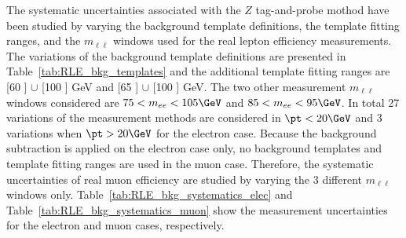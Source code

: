 The systematic uncertainties associated with the $Z$ tag-and-probe mothod have been studied by varying the background template definitions, the template fitting ranges, and the $m_{\ell\ell}$ windows used for the real lepton efficiency measurements.
The variations of the background template definitions are presented in Table~\ref{tab:RLE_bkg_templates} and the additional template fitting ranges are [60 ] $\cup$ [100 ] GeV and [65 ] $\cup$ [100 ] GeV.
The two other measurement $m_{\ell\ell}$ windows considered are $75<m_{ee}<105 \GeV$ and $85<m_{ee}<95 \GeV$.
In total 27 variations of the measurement methods are considered in $\pt<20 \GeV$ and 3 variations when $\pt>20 \GeV$ for the electron case.
Because the background subtraction is applied on the electron case only, no background templates and template fitting ranges are used in the muon case.
Therefore, the systematic uncertainties of real muon efficiency are studied by varying the 3 different $m_{\ell\ell}$ windows only.
Table~\ref{tab:RLE_bkg_systematics_elec} and Table~\ref{tab:RLE_bkg_systematics_muon} show the measurement uncertainties for the electron and muon cases, respectively.

